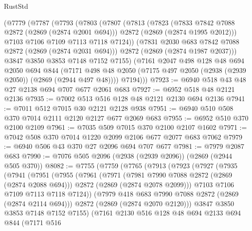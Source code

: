 \begin{lexlean}{RustStd}
\begin{coremodule}
{\begin{coremodule}
{{{{{{{{{{{{    (@7779
      (@7787
        (@7793
          (@7803
            (@7807
              (@7813
                (@7823
                  (@7833 @7842 @7088 @2872 (@2869 (@2874 @2001 @694)))
                  @2872
                  (@2869 (@2874 @1995 @2012)))
                @7103
                @7106
                @7109
                @7113
                @7118
                @7124))
            (@7831 @2030 @683 @7842 @7088 @2872 (@2869 (@2874 @2031 @694)))
            @2872
            (@2869 (@2874 @1987 @2037)))
          @3847
          @3850
          @3853
          @7148
          @7152
          @7155)
        (@7161
          @2047
          @498
          @128
          @48
          @694
          @2050
          @694
          @844
          (@7171 @498 @48 @2050 (@7175 @497 @2050 (@2938 (@2939 @2050)) (@2869 (@2944 @497 @48))))
          @7194)))
@7923 := @6940 @518 @43 @48 @27 @2138 @694 @707 @677 @2061 @683
@7927 := @6952 @518 @48 @2121 @2136
@7935 := @7002 @513 @516 @128 @48 @2121 @2130 @694 @2136
@7941 := @7011 @512 @7015 @30 @2121 @2128 @938
@7951 := @6940 @510 @508 @370 @7014 @2111 @2120 @2127 @677 @2069 @683
@7955 := @6952 @510 @370 @2100 @2109
@7961 := @7035 @509 @7015 @370 @2100 @2107 @1602
@7971 := @7042 @508 @370 @7014 @1220 @2099 @2106 @677 @2077 @683 @7062
@7979 := @6940 @506 @43 @370 @27 @2096 @694 @707 @677
@7981 := @7979 @2087 @683
@7990 := @7076 @505 @2096 (@2938 (@2939 @2096)) (@2869 (@2944 @505 @370))
@8082 := @7755
    (@7759
      (@7765
        (@7913
          (@7923
            (@7927
              (@7935
                (@7941
                  (@7951
                    (@7955
                      (@7961
                        (@7971
                          (@7981 @7990 @7088 @2872 (@2869 (@2874 @2088 @694)))
                          @2872
                          (@2869 (@2874 @2078 @2099)))
                        @7103
                        @7106
                        @7109
                        @7113
                        @7118
                        @7124))
                    (@7979 @418 @683 @7990 @7088 @2872 (@2869 (@2874 @2114 @694)))
                    @2872
                    (@2869 (@2874 @2070 @2120)))
                  @3847
                  @3850
                  @3853
                  @7148
                  @7152
                  @7155)
                (@7161
                  @2130
                  @516
                  @128
                  @48
                  @694
                  @2133
                  @694
                  @844
                  (@7171
                    @516
}}}}}}}}}}}}
\end{coremodule}}
\end{coremodule}
\end{lexlean}
